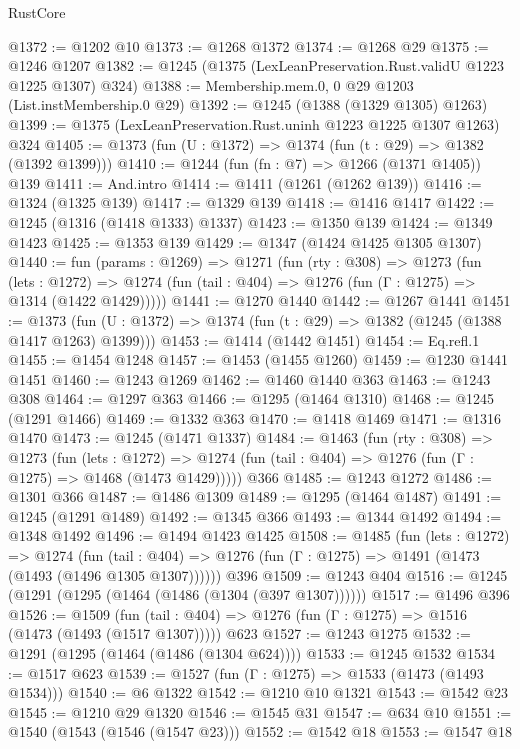 \begin{lexlean}{RustCore}
\begin{coremodule}
@1372 := @1202 @10
@1373 := @1268 @1372
@1374 := @1268 @29
@1375 := @1246 @1207
@1382 := @1245 (@1375 (LexLeanPreservation.Rust.validU @1223 @1225 @1307) @324)
@1388 := Membership.mem.{0, 0} @29 @1203 (List.instMembership.{0} @29)
@1392 := @1245 (@1388 (@1329 @1305) @1263)
@1399 := @1375 (LexLeanPreservation.Rust.uninh @1223 @1225 @1307 @1263) @324
@1405 := @1373 (fun (U : @1372) => @1374 (fun (t : @29) => @1382 (@1392 @1399)))
@1410 := @1244 (fun (fn : @7) => @1266 (@1371 @1405)) @139
@1411 := And.intro
@1414 := @1411 (@1261 (@1262 @139))
@1416 := @1324 (@1325 @139)
@1417 := @1329 @139
@1418 := @1416 @1417
@1422 := @1245 (@1316 (@1418 @1333) @1337)
@1423 := @1350 @139
@1424 := @1349 @1423
@1425 := @1353 @139
@1429 := @1347 (@1424 @1425 @1305 @1307)
@1440 := fun (params : @1269) =>
  @1271
    (fun (rty : @308) =>
    @1273
      (fun (lets : @1272) =>
      @1274 (fun (tail : @404) => @1276 (fun (Γ : @1275) => @1314 (@1422 @1429)))))
@1441 := @1270 @1440
@1442 := @1267 @1441
@1451 := @1373 (fun (U : @1372) => @1374 (fun (t : @29) => @1382 (@1245 (@1388 @1417 @1263) @1399)))
@1453 := @1414 (@1442 @1451)
@1454 := Eq.refl.{1}
@1455 := @1454 @1248
@1457 := @1453 (@1455 @1260)
@1459 := @1230 @1441 @1451
@1460 := @1243 @1269
@1462 := @1460 @1440 @363
@1463 := @1243 @308
@1464 := @1297 @363
@1466 := @1295 (@1464 @1310)
@1468 := @1245 (@1291 @1466)
@1469 := @1332 @363
@1470 := @1418 @1469
@1471 := @1316 @1470
@1473 := @1245 (@1471 @1337)
@1484 := @1463
    (fun (rty : @308) =>
    @1273
      (fun (lets : @1272) =>
      @1274 (fun (tail : @404) => @1276 (fun (Γ : @1275) => @1468 (@1473 @1429)))))
    @366
@1485 := @1243 @1272
@1486 := @1301 @366
@1487 := @1486 @1309
@1489 := @1295 (@1464 @1487)
@1491 := @1245 (@1291 @1489)
@1492 := @1345 @366
@1493 := @1344 @1492
@1494 := @1348 @1492
@1496 := @1494 @1423 @1425
@1508 := @1485
    (fun (lets : @1272) =>
    @1274
      (fun (tail : @404) => @1276 (fun (Γ : @1275) => @1491 (@1473 (@1493 (@1496 @1305 @1307))))))
    @396
@1509 := @1243 @404
@1516 := @1245 (@1291 (@1295 (@1464 (@1486 (@1304 (@397 @1307))))))
@1517 := @1496 @396
@1526 := @1509
    (fun (tail : @404) => @1276 (fun (Γ : @1275) => @1516 (@1473 (@1493 (@1517 @1307)))))
    @623
@1527 := @1243 @1275
@1532 := @1291 (@1295 (@1464 (@1486 (@1304 @624))))
@1533 := @1245 @1532
@1534 := @1517 @623
@1539 := @1527 (fun (Γ : @1275) => @1533 (@1473 (@1493 @1534)))
@1540 := @6 @1322
@1542 := @1210 @10 @1321
@1543 := @1542 @23
@1545 := @1210 @29 @1320
@1546 := @1545 @31
@1547 := @634 @10
@1551 := @1540 (@1543 (@1546 (@1547 @23)))
@1552 := @1542 @18
@1553 := @1547 @18

\end{coremodule}
\end{lexlean}
